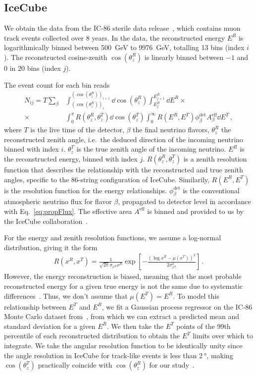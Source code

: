 \documentclass{revtex4-2}
\newcommand{\zreco}{\ensuremath{\cos{(\theta_z^{R})}}}
\newcommand{\ztrue}{\ensuremath{\cos{(\theta_z^{T})}}}
\newcommand{\treco}{\ensuremath{\theta_z^{R}}}
\newcommand{\ttrue}{\ensuremath{\theta_z^{T}}}
\newcommand{\xreco}{\ensuremath{x^R}}
\newcommand{\xtrue}{\ensuremath{x^T}}
\newcommand{\Ereco}{E^{R}}
\newcommand{\Etrue}{E^{T}}
\begin{document}
\subsection{IceCube}\label{ch:ICmethod}

We obtain the data from the IC-86 sterile data release~\cite{IC2020}, which contains muon track events collected over 8 years. 
In the data, the reconstructed energy $\Ereco$ is logarithmically binned between \SI{500}{\GeV} to \SI{9976}{\GeV}, totalling 13 bins (index $i$).
The reconstructed cosine-zenith $\zreco$ is linearly binned between $-1$ and $0$ in 20 bins (index $j$). 

The event count for each bin reads
\begin{align}\label{eq:ICevents}
    N_{ij} = T \sum_\beta &\int_{(\zreco)_i}^{(\zreco)_{i+1}} \dd \zreco \int_{\Ereco_{j}}^{\Ereco_{j+1}} \dd \Ereco \times \nonumber \\
    \times &\int_0^\pi R(\treco,\ttrue) \dd \ztrue \int_0^\infty R(\Ereco,\Etrue) \phi_\beta^\text{det}  A^\text{eff}_\beta \dd \Etrue
    \,,
\end{align}
where $T$ is the live time of the detector, $\beta$ the final neutrino flavors, $\treco$ the reconstructed 
zenith angle, i.e.~the deduced direction of the incoming neutrino binned with index $i$. $\ttrue$ is the true zenith angle of the incoming neutrino. 
$\Ereco$ is the reconstructed energy, binned with index $j$. $R(\treco,\ttrue)$ is a zenith resolution function 
that describes the relationship with the reconstructed and true zenith angles, specific to the 86-string configuration of IceCube.
Similarily, $R(\Ereco,\Etrue)$ is the resolution function for the energy relationships. $\phi_\beta^\text{det}$ is the conventional atmospheric neutrino flux for flavor $\beta$, propagated to detector level
in accordance with Eq.~\ref{eq:propFlux}. The effective area $A^\text{eff}$ is binned and provided to us by the IceCube collaboration~\cite{ICaeff}.

For the energy and zenith resolution functions, we assume a log-normal distribution, giving it the form 
\begin{align}
    R(\xreco, \xtrue) = \frac{1}{\sqrt{2\pi} \sigma_{\xreco}\xreco} \exp\left[-\frac{(\log \xreco-\mu(\xtrue))^2}{2\sigma_{\xreco}^2}\right]\,.
\end{align}
However, the energy reconstruction is biased, meaning that the most probable reconstructed energy for a given true energy is not the same due to 
systematic differences~\cite{weaverThesis}. Thus, we don't assume that $\mu(\Etrue) =\Ereco$. 
To model this relationship between $\Etrue$ and $\Ereco$, we fit a Gaussian process regressor on the IC-86 Monte Carlo dataset from~\cite{IC2016}, from which
we can extract a predicted mean and standard deviation for a given $\Ereco$. We then take the $\Etrue$ points of the 99th percentile of each reconstructed
distribution to obtain the $\Etrue$ limits over which to integrate. We take the angular resolution function to be identically unity since the angle resolution in IceCube for track-like 
events is less than $\SI{2}{\degree}$, making $\ztrue$ practically coincide with $\zreco$ for our study~\cite{IC2020}. 
\end{document}
